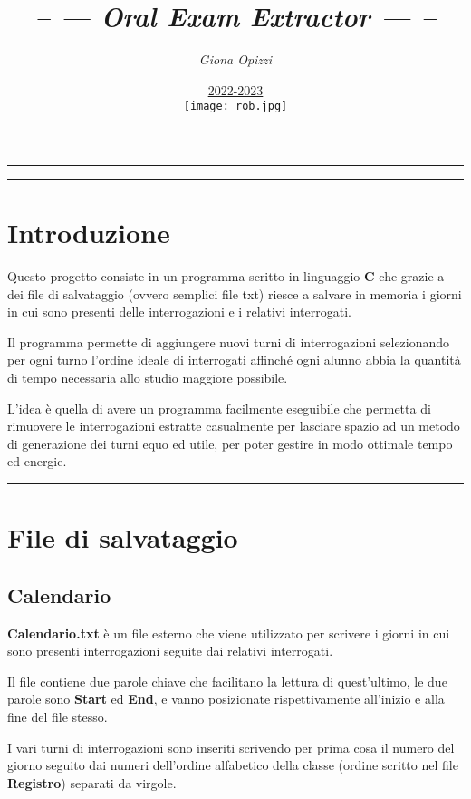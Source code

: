 \documentclass[14pt]{extarticle}
\title{\textbf{\textit{-- --- Oral Exam Extractor --- --}}}
\author{\textit{Giona Opizzi}}
\date{\underline{2022-2023}\\\vspace{90px}\texttt{[image: rob.jpg]}}
\begin{document}
\maketitle
\newpage
\vspace{100px}
\par\noindent\rule{\textwidth}{0.8pt}
\tableofcontents
\newpage
\par\noindent\rule{\textwidth}{0.2pt}
\section{Introduzione}
\vspace{50px}
Questo progetto consiste in un programma scritto in linguaggio \textbf{C} che grazie a dei file di salvataggio (ovvero semplici file txt) riesce a salvare in memoria i giorni in cui sono presenti delle interrogazioni e i relativi interrogati.

Il programma permette di aggiungere nuovi turni di interrogazioni selezionando per ogni turno l'ordine ideale di interrogati affinché ogni alunno abbia la quantità di tempo necessaria allo studio maggiore possibile.

L'idea è quella di avere un programma facilmente eseguibile che permetta di rimuovere le interrogazioni estratte casualmente per lasciare spazio ad un metodo di generazione dei turni equo ed utile, per poter gestire in modo ottimale tempo ed energie.
\vspace{50px}
\par\noindent\rule{\textwidth}{0.2pt}
\section{File di salvataggio}
\vspace{50px}
\subsection{Calendario}
\textbf{Calendario.txt} è un file esterno che viene utilizzato per scrivere i giorni in cui sono presenti interrogazioni seguite dai relativi interrogati.

Il file contiene due parole chiave che facilitano la lettura di quest'ultimo, le due parole sono \textbf{Start} ed \textbf{End}, e vanno posizionate rispettivamente all'inizio e alla fine del file stesso.

I vari turni di interrogazioni sono inseriti scrivendo per prima cosa il numero del giorno seguito dai numeri dell'ordine alfabetico della classe (ordine scritto nel file \textbf{Registro}) separati da virgole.
\end{document}
